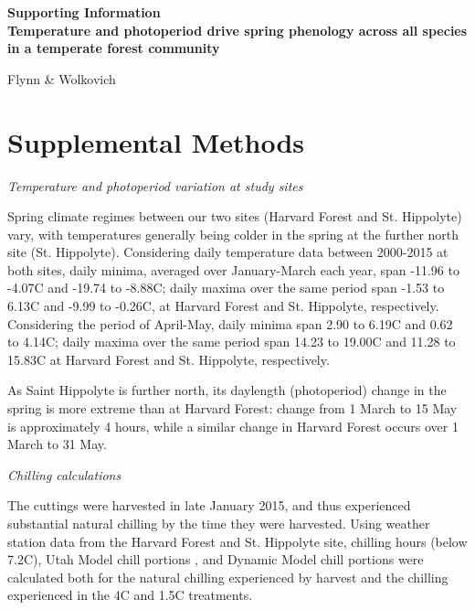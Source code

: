 \documentclass{article}
\begin{document}

\begin{center}
\textbf{\Large{Supporting Information \vspace{1ex}\\Temperature and photoperiod drive spring phenology across all species in a temperate forest community}}

Flynn \& Wolkovich
\end{center}

\renewcommand{\thetable}{S\arabic{table}}
\renewcommand{\thefigure}{S\arabic{figure}}

\section*{Supplemental Methods}

\noindent\emph{Temperature and photoperiod variation at study sites}

\noindent Spring climate regimes between our two sites (Harvard Forest and St. Hippolyte) vary, with temperatures generally being colder in the spring at the further north site (St. Hippolyte). Considering daily temperature data between 2000-2015 at both sites, daily minima, averaged over January-March each year, span -11.96 to -4.07\degree C and -19.74 to -8.88\degree C; daily maxima over the same period span -1.53 to 6.13\degree C and -9.99 to -0.26\degree C, at Harvard Forest and St. Hippolyte, respectively. Considering the period of April-May, daily minima span 2.90 to 6.19\degree C and 0.62 to 4.14\degree C; daily maxima over the same period span 14.23 to 19.00\degree C and 11.28 to 15.83\degree C at Harvard Forest and St. Hippolyte, respectively. 

\noindent As Saint Hippolyte is further north, its daylength (photoperiod) change in the spring is more extreme than at Harvard Forest: change from 1 March to 15 May is approximately 4 hours, while a similar change in Harvard Forest occurs over 1 March to 31 May. 

\noindent\emph{Chilling calculations}

\noindent The cuttings were harvested in late January 2015, and thus experienced substantial natural chilling by the time they were harvested. Using weather station data from the Harvard Forest and St. Hippolyte site, chilling hours (below 7.2\degree C), Utah Model chill portions \citep{utahmodel}, and Dynamic Model \citep{Erez:1988} chill portions were calculated both for the natural chilling experienced by harvest and the chilling experienced in the 4\degree C and 1.5\degree C treatments. 
\end{document}
